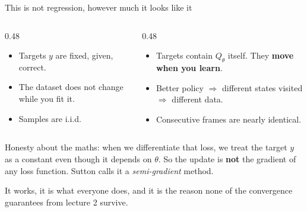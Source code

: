 \documentclass[aspectratio=169]{beamer}
\begin{document}
\begin{frame}{This is not regression, however much it looks like it}
  \begin{columns}[T]
    \begin{column}{0.48\textwidth}
      \begin{tcolorbox}[colback=armblue!8, colframe=armblue, boxrule=0.6pt, arc=2pt,
                        title={\textbf{Supervised learning}}]
        \small
        \begin{itemize}\itemsep2pt
          \item Targets $y$ are fixed, given, correct.
          \item The dataset does not change while you fit it.
          \item Samples are i.i.d.
        \end{itemize}
      \end{tcolorbox}
    \end{column}
    \begin{column}{0.48\textwidth}
      \begin{tcolorbox}[colback=armred!8, colframe=armred, boxrule=0.6pt, arc=2pt,
                        title={\textbf{Fitting $Q_\theta$}}]
        \small
        \begin{itemize}\itemsep2pt
          \item Targets contain $Q_{\theta}$ itself. They \textbf{move when you learn}.
          \item Better policy $\Rightarrow$ different states visited $\Rightarrow$ different data.
          \item Consecutive frames are nearly identical.
        \end{itemize}
      \end{tcolorbox}
    \end{column}
  \end{columns}

  \vskip 8pt
  \begin{tcolorbox}[colback=armorange!12, colframe=armorange, boxrule=0.6pt, arc=2pt,
                    title={\textbf{The semi-gradient}}]
    \small
    Honesty about the maths: when we differentiate that loss, we treat the target $y$ as a
    constant even though it depends on $\theta$. So the update is \textbf{not} the gradient of
    any loss function. Sutton calls it a \emph{semi-gradient} method.

    \vskip 4pt
    It works, it is what everyone does, and it is the reason none of the convergence guarantees
    from lecture 2 survive.
  \end{tcolorbox}
\end{frame}
\end{document}
